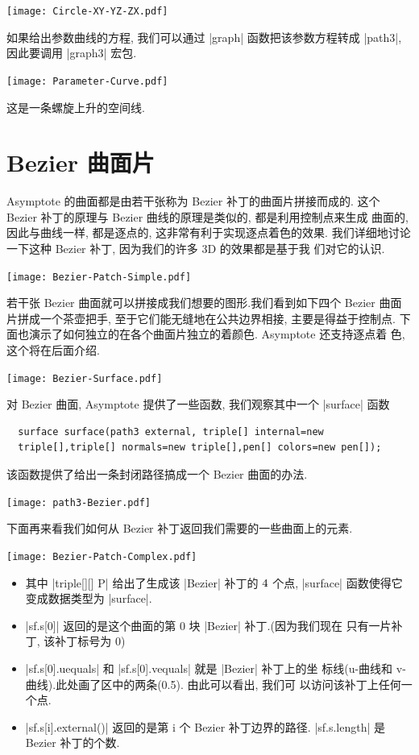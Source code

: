 \documentclass{ctexbook}
\begin{document}
\begin{center}\texttt{[image: Circle-XY-YZ-ZX.pdf]}\end{center}%


如果给出参数曲线的方程, 我们可以通过 |graph| 函数把该参数方程转成
|path3|, 因此要调用 |graph3| 宏包.
\begin{center}\texttt{[image: Parameter-Curve.pdf]}\end{center}%

这是一条螺旋上升的空间线.

\section{Bezier 曲面片}
Asymptote 的曲面都是由若干张称为 Bezier 补丁的曲面片拼接而成的. 这个
Bezier 补丁的原理与 Bezier 曲线的原理是类似的, 都是利用控制点来生成
曲面的, 因此与曲线一样, 都是逐点的, 这非常有利于实现逐点着色的效果.
我们详细地讨论一下这种 Bezier 补丁, 因为我们的许多 3D 的效果都是基于我
们对它的认识.
\begin{center}\texttt{[image: Bezier-Patch-Simple.pdf]}\end{center}%

若干张 Bezier 曲面就可以拼接成我们想要的图形.我们看到如下四个 Bezier 曲面
片拼成一个茶壶把手, 至于它们能无缝地在公共边界相接, 主要是得益于控制点.
下面也演示了如何独立的在各个曲面片独立的着颜色. Asymptote 还支持逐点着
色, 这个将在后面介绍.
\begin{center}\texttt{[image: Bezier-Surface.pdf]}\end{center}%

对 Bezier 曲面, Asymptote 提供了一些函数, 我们观察其中一个 |surface| 函数
\begin{lstlisting}
  surface surface(path3 external, triple[] internal=new
  triple[],triple[] normals=new triple[],pen[] colors=new pen[]);
\end{lstlisting}
该函数提供了给出一条封闭路径搞成一个 Bezier 曲面的办法.
\begin{center}\texttt{[image: path3-Bezier.pdf]}\end{center}%

下面再来看我们如何从 Bezier 补丁返回我们需要的一些曲面上的元素.
\begin{center}\texttt{[image: Bezier-Patch-Complex.pdf]}\end{center}%

\begin{itemize}
\item 其中 |triple[][] P| 给出了生成该 |Bezier| 补丁的 $4 \time 4$ 个点,
  |surface| 函数使得它变成数据类型为 |surface|.
\item |sf.s[0]| 返回的是这个曲面的第 0 块 |Bezier| 补丁.(因为我们现在
  只有一片补丁, 该补丁标号为 0)
\item |sf.s[0].uequals| 和 |sf.s[0].vequals| 就是 |Bezier| 补丁上的坐
  标线(u-曲线和 v-曲线).此处画了区中的两条(0.5). 由此可以看出, 我们可
  以访问该补丁上任何一个点.
\item |sf.s[i].external()| 返回的是第 i 个 Bezier 补丁边界的路径.
  |sf.s.length| 是 Bezier 补丁的个数.
\end{itemize}
\end{document}

